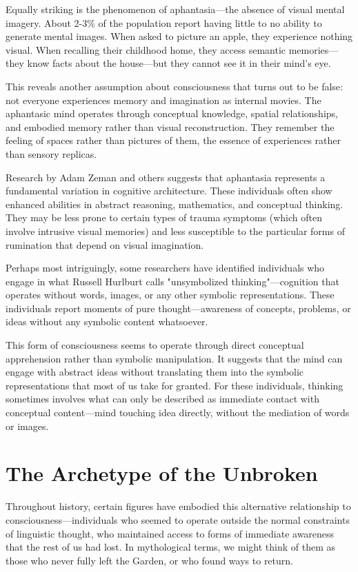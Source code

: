 Equally striking is the phenomenon of aphantasia—the absence of visual mental imagery. About 2-3\% of the population report having little to no ability to generate mental images. When asked to picture an apple, they experience nothing visual. When recalling their childhood home, they access semantic memories—they know facts about the house—but they cannot see it in their mind's eye.

This reveals another assumption about consciousness that turns out to be false: not everyone experiences memory and imagination as internal movies. The aphantasic mind operates through conceptual knowledge, spatial relationships, and embodied memory rather than visual reconstruction. They remember the feeling of spaces rather than pictures of them, the essence of experiences rather than sensory replicas.

Research by Adam Zeman and others suggests that aphantasia represents a fundamental variation in cognitive architecture. These individuals often show enhanced abilities in abstract reasoning, mathematics, and conceptual thinking. They may be less prone to certain types of trauma symptoms (which often involve intrusive visual memories) and less susceptible to the particular forms of rumination that depend on visual imagination.

Perhaps most intriguingly, some researchers have identified individuals who engage in what Russell Hurlburt calls "unsymbolized thinking"—cognition that operates without words, images, or any other symbolic representations. These individuals report moments of pure thought—awareness of concepts, problems, or ideas without any symbolic content whatsoever.

This form of consciousness seems to operate through direct conceptual apprehension rather than symbolic manipulation. It suggests that the mind can engage with abstract ideas without translating them into the symbolic representations that most of us take for granted. For these individuals, thinking sometimes involves what can only be described as immediate contact with conceptual content—mind touching idea directly, without the mediation of words or images.

\section{The Archetype of the Unbroken}

Throughout history, certain figures have embodied this alternative relationship to consciousness—individuals who seemed to operate outside the normal constraints of linguistic thought, who maintained access to forms of immediate awareness that the rest of us had lost. In mythological terms, we might think of them as those who never fully left the Garden, or who found ways to return.

